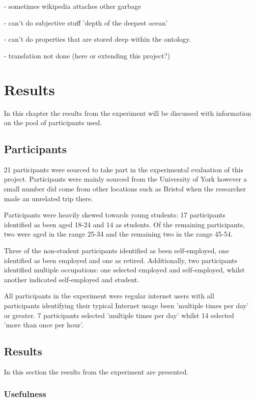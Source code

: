 \documentclass[authoryearcitations]{UoYCSproject}
\begin{document}
 - sometimes wikipedia attaches other garbage
 
 - can't do subjective stuff 'depth of the deepest ocean'
 
 - can't do properties that are stored deep within the ontology.
 
 - translation not done (here or extending this project?)

\newpage
\chapter{Results}
\label{sec:results}

In this chapter the results from the experiment will be discussed with information on the pool of participants used.

\section{Participants}
\label{sec:participants}

21 participants were sourced to take part in the experimental evaluation of this project. Participants were mainly sourced from the University of York however a small number did come from other locations such as Bristol when the researcher made an unrelated trip there.

Participants were heavily skewed towards young students: 17 participants identified as been aged 18-24 and 14 as students. Of the remaining participants, two were aged in the range 25-34 and the remaining two in the range 45-54.

Three of the non-student participants identified as been self-employed, one identified as been employed and one as retired. Additionally, two participants identified multiple occupations: one selected employed and self-employed, whilst another indicated self-employed and student.

All participants in the experiment were regular internet users with all participants identifying their typical Internet usage been 'multiple times per day' or greater. 7 participants selected 'multiple times per day' whilst 14 selected 'more than once per hour'.

\section{Results}
\label{sec:results}

In this section the results from the experiment are presented.

\subsection{Usefulness}
\label{subsec:resultsUsefulness}
\end{document}
